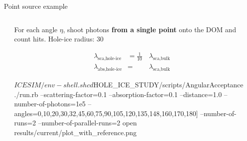 
\begin{frame}[fragile]{Point source example}

  \begin{columns}
    \begin{column}{0.5\textwidth}
    \end{column}
    \begin{column}{0.5\textwidth}

      For each angle $\eta$, shoot photons \textbf{from a single point} onto the DOM and count hits.
      \small{Hole-ice radius: 30\cm}

      \begin{equation*}\begin{align}
        \lambda_\text{sca,hole-ice} &= \frac{1}{10}\, & \lambda_\text{sca,bulk} \\
        \lambda_\text{abs,hole-ice} &= & \lambda_\text{sca,bulk}
      \end{align}\end{equation*}

      \begin{smallbash}
        $ICESIM/env-shell.sh
        cd $HOLE_ICE_STUDY/scripts/AngularAcceptance
        ./run.rb --scattering-factor=0.1 --absorption-factor=0.1 --distance=1.0 --number-of-photons=1e5 --angles=0,10,20,30,32,45,60,75,90,105,120,135,148,160,170,180] --number-of-runs=2 --number-of-parallel-runs=2
        open results/current/plot_with_reference.png
      \end{smallbash}

    \end{column}
  \end{columns}


\end{frame}

